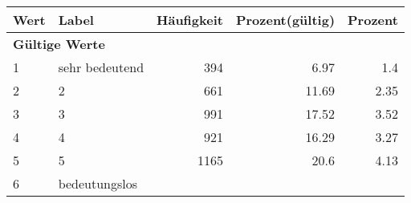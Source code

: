      \begin{longtable}{lXrrr}
     \toprule
     \textbf{Wert} & \textbf{Label} & \textbf{Häufigkeit} & \textbf{Prozent(gültig)} & \textbf{Prozent} \\
     \endhead
     \midrule
     \multicolumn{5}{l}{\textbf{Gültige Werte}}\\

     1 &
     \multicolumn{1}{X}{ sehr bedeutend   } &


       \num{394} &
       \num[round-mode=places,round-precision=2]{6.97} &
         \num[round-mode=places,round-precision=2]{1.4} \\

     2 &
     \multicolumn{1}{X}{ 2   } &


       \num{661} &
       \num[round-mode=places,round-precision=2]{11.69} &
         \num[round-mode=places,round-precision=2]{2.35} \\

     3 &
     \multicolumn{1}{X}{ 3   } &


       \num{991} &
       \num[round-mode=places,round-precision=2]{17.52} &
         \num[round-mode=places,round-precision=2]{3.52} \\

     4 &
     \multicolumn{1}{X}{ 4   } &


       \num{921} &
       \num[round-mode=places,round-precision=2]{16.29} &
         \num[round-mode=places,round-precision=2]{3.27} \\

     5 &
     \multicolumn{1}{X}{ 5   } &


       \num{1165} &
       \num[round-mode=places,round-precision=2]{20.6} &
         \num[round-mode=places,round-precision=2]{4.13} \\

     6 &
     \multicolumn{1}{X}{ bedeutungslos   } &



\end{longtable}
